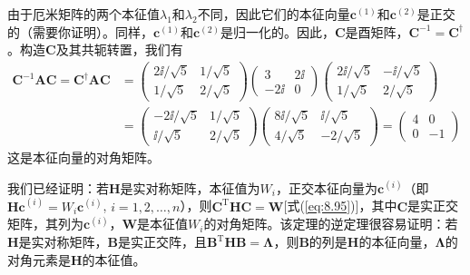 \begin{examplebox}
        由于厄米矩阵的两个本征值$\lambda_1$和$\lambda_2$不同，因此它们的本征向量$\mathbf{c}^{\left(1\right)}$和$\mathbf{c}^{\left(2\right)}$是正交的（需要你证明）。同样，$\mathbf{c}^{\left(1\right)}$和$\mathbf{c}^{\left(2\right)}$是归一化的。因此，$\mathbf{C}$是酉矩阵，$\mathbf{C}^{-1} = \mathbf{C}^{\dagger}$。构造$\mathbf{C}$及其共轭转置，我们有
        \begin{equation*}
            \begin{aligned}
                \mathbf{C}^{-1} \mathbf{AC} = \mathbf{C}^{\dagger} \mathbf{A} \mathbf{C} &= \begin{pmatrix}
                    2\ii /\sqrt{5} & 1/\sqrt{5} \\
                    1/\sqrt{5} & 2/\sqrt{5}
                \end{pmatrix} \begin{pmatrix}
                    3 & 2\ii \\
                    -2\ii & 0
                \end{pmatrix} \begin{pmatrix}
                    2\ii /\sqrt{5} & -\ii /\sqrt{5} \\
                    1/\sqrt{5} & 2/\sqrt{5}
                \end{pmatrix} \\
                &= \begin{pmatrix}
                    -2\ii /\sqrt{5} & 1/\sqrt{5} \\
                    \ii /\sqrt{5} & 2/\sqrt{5}
                \end{pmatrix} \begin{pmatrix}
                    8\ii /\sqrt{5} & \ii /\sqrt{5} \\
                    4/\sqrt{5} & -2/\sqrt{5}
                \end{pmatrix}  = \begin{pmatrix}
                    4 & 0 \\
                    0 & -1
                \end{pmatrix}
            \end{aligned}
        \end{equation*}
        这是本征向量的对角矩阵。
    \end{examplebox}

    我们已经证明：若$\mathbf{H}$是实对称矩阵，本征值为$W_i$，正交本征向量为$\mathbf{c}^{\left(i\right)}$（即$\mathbf{Hc}^{\left(i\right)} = W_i\mathbf{c}^{\left(i\right)}$, $i = 1,2,\ldots,n$），则$\mathbf{C}^{\mathrm{T}}\mathbf{H}\mathbf{C} = \mathbf{W}$[式(\ref{eq:8.95})]，其中$\mathbf{C}$是实正交矩阵，其列为$\mathbf{c}^{\left(i\right)}$，$\mathbf{W}$是本征值$W_i$的对角矩阵。该定理的逆定理很容易证明：若$\mathbf{H}$是实对称矩阵，$\mathbf{B}$是实正交阵，且$\mathbf{B}^{\mathrm{T}}\mathbf{H}\mathbf{B} = \symbf{\Lambda}$，则$\mathbf{B}$的列是$\mathbf{H}$的本征向量，$\symbf{\Lambda}$的对角元素是$\mathbf{H}$的本征值。

